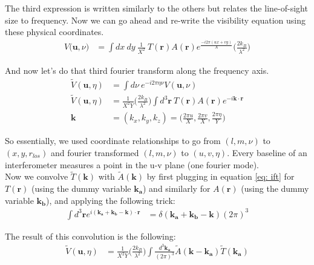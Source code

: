 \documentclass[12pt]{article}
\begin{document}
\noindent The third expression is written similarly to the others but relates the line-of-sight size to frequency. Now we can go ahead and re-write the visibility equation using these physical coordinates.
\begin{align}
V\Big(\boldsymbol{u},\nu \Big) &= \int dx \ dy \ {\frac{1}{X^{2}}} \ T(\boldsymbol{r})A(\boldsymbol{r})e^{{\frac{-i2\pi(ux+vy)}{X}}}\Big({\frac{2k_{B}}{\lambda^{2}}}\Big)
\end{align}

\noindent And now let's do that third fourier transform along the frequency axis.
\begin{align}
\tilde{V}(\boldsymbol{u},\eta) &= \int d\nu \ e^{-i2\pi\eta\nu}V(\boldsymbol{u},\nu) \\
\tilde{V}(\boldsymbol{u},\eta) &= {\frac{1}{X^{2}Y}}\Big({\frac{2k_{B}}{\lambda^{2}}}\Big) \int d^{3}\boldsymbol{r} \ T(\boldsymbol{r}) A(\boldsymbol{r})e^{-i\boldsymbol{k} \cdot \boldsymbol{r}} \\
\boldsymbol{k} &= (k_{x},k_{y},k_{z}) = \Big({\frac{2\pi u}{X}},{\frac{2\pi v}{X}},{\frac{2\pi \eta}{Y}}\Big)
\end{align}

\noindent So essentially, we used coordinate relationships to go from $(l, m, \nu)$ to $(x, y, r_{los})$ and fourier transformed $(l, m, \nu)$ to $(u, v, \eta)$. Every baseline of an interferometer measures a point in the u-v plane (one fourier mode). \\

\noindent Now we convolve $\tilde{T}(\boldsymbol{k})$ with $\tilde{A}(\boldsymbol{k})$ by first plugging in equation \ref{eq: ift} for $T(\boldsymbol{r})$ (using the dummy variable $\boldsymbol{k_{a}}$) and similarly for $A(\boldsymbol{r})$ (using the dummy variable $\boldsymbol{k_{b}}$), and applying the following trick:
\begin{align} \label{eq: deltatrick}
\int d^{3}\boldsymbol{r} e^{i(\boldsymbol{k_{a}}+\boldsymbol{k_{b}} - \boldsymbol{k}) \cdot \boldsymbol{r}} &= \delta (\boldsymbol{k_{a}}+\boldsymbol{k_{b}} - \boldsymbol{k}) (2\pi)^{3}
\end{align}

\noindent The result of this convolution is the following:
\begin{align}
\tilde{V}(\boldsymbol{u},\eta) &= {\frac{1}{X^{2}Y}}\Big({\frac{2k_{B}}{\lambda^{2}}}\Big) \int {\frac{d^{3}\boldsymbol{k_{a}}}{(2\pi)^{3}}} \tilde{A}(\boldsymbol{k}-\boldsymbol{k_{a}}) \tilde{T}(\boldsymbol{k_{a}})
\end{align}
\end{document}
